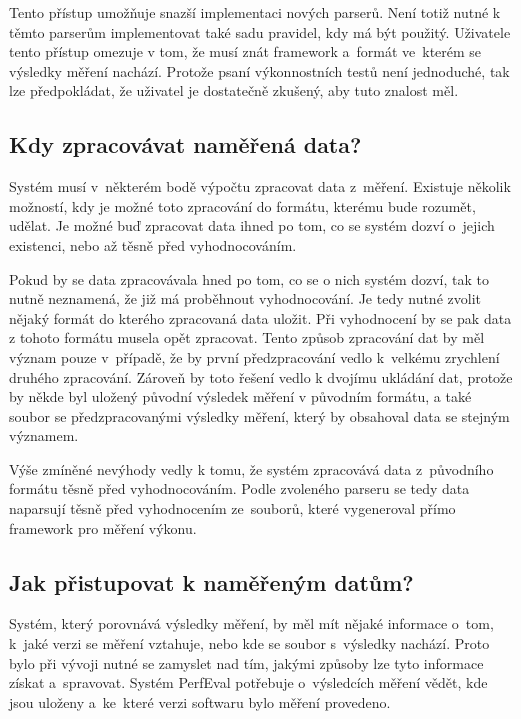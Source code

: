 Tento přístup umožňuje snazší implementaci nových parserů. Není totiž nutné k těmto parserům implementovat
také sadu pravidel, kdy má být použitý. Uživatele tento přístup omezuje v tom, že musí znát framework a~formát
ve~kterém se výsledky měření nachází. Protože psaní výkonnostních testů není jednoduché, tak lze předpokládat,
že uživatel je dostatečně zkušený, aby tuto znalost měl.

\subsection{Kdy zpracovávat naměřená data?}

Systém musí v~některém bodě výpočtu zpracovat data z~měření. Existuje několik možností, kdy
je možné toto zpracování do formátu, kterému bude rozumět, udělat. Je možné buď zpracovat
data ihned po tom, co se systém dozví o~jejich existenci, nebo až těsně před vyhodnocováním.

Pokud by se data zpracovávala hned po tom, co se o nich systém dozví, tak to nutně neznamená,
že již má proběhnout vyhodnocování. Je tedy nutné zvolit nějaký formát do kterého zpracovaná data
uložit. Při vyhodnocení by se pak data z tohoto formátu musela opět zpracovat. Tento způsob
zpracování dat by měl význam pouze v~případě, že by první předzpracování vedlo k~velkému
zrychlení druhého zpracování. Zároveň by toto řešení vedlo k dvojímu ukládání dat, protože
by někde byl uložený původní výsledek měření v původním formátu, a také soubor se předzpracovanými
výsledky měření, který by obsahoval data se stejným významem.

Výše zmíněné nevýhody vedly k tomu, že systém zpracovává data z~původního formátu těsně před
vyhodnocováním. Podle zvoleného parseru se tedy data naparsují těsně před vyhodnocením ze~souborů,
které vygeneroval přímo framework pro měření výkonu.

\subsection{Jak přistupovat k naměřeným datům?}

Systém, který porovnává výsledky měření, by měl mít nějaké informace o~tom, k~jaké verzi se měření vztahuje, nebo kde
se soubor s~výsledky nachází. Proto bylo při vývoji nutné se zamyslet nad tím, jakými způsoby lze tyto informace získat a~spravovat.
Systém PerfEval potřebuje o~výsledcích měření vědět, kde jsou uloženy a~ke~které verzi softwaru bylo měření provedeno.

